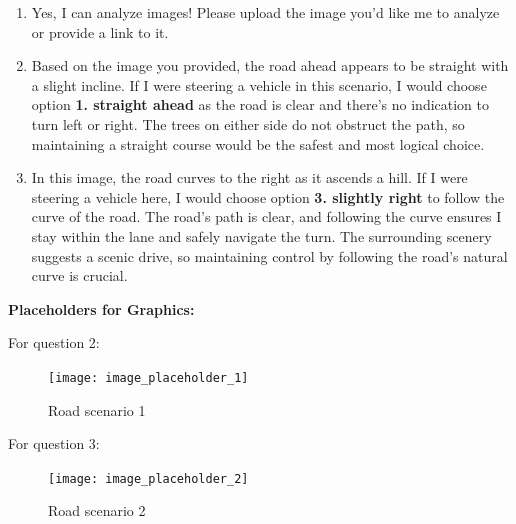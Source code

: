 \begin{enumerate}
    \item Yes, I can analyze images! Please upload the image you'd like me to analyze or provide a link to it.
    \item Based on the image you provided, the road ahead appears to be straight with a slight incline. If I were steering a vehicle in this scenario, I would choose option \textbf{1. straight ahead} as the road is clear and there's no indication to turn left or right. The trees on either side do not obstruct the path, so maintaining a straight course would be the safest and most logical choice.
    \item In this image, the road curves to the right as it ascends a hill. If I were steering a vehicle here, I would choose option \textbf{3. slightly right} to follow the curve of the road. The road's path is clear, and following the curve ensures I stay within the lane and safely navigate the turn. The surrounding scenery suggests a scenic drive, so maintaining control by following the road's natural curve is crucial.
\end{enumerate}

\textbf{Placeholders for Graphics:}

For question 2:
\begin{figure}[h]
    \centering
    \texttt{[image: image\_placeholder\_1]}
    \caption{Road scenario 1}
    \label{fig:road_scenario_1}
\end{figure}

For question 3:
\begin{figure}[h]
    \centering
    \texttt{[image: image\_placeholder\_2]}
    \caption{Road scenario 2}
    \label{fig:road_scenario_2}
\end{figure}







